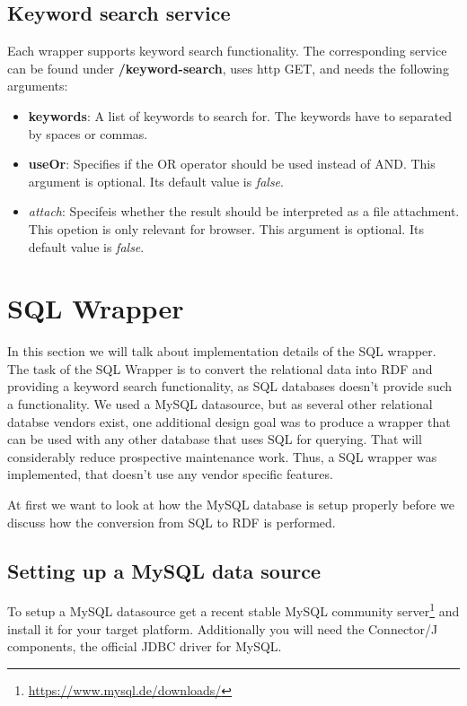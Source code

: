 \subsection{Keyword search service}

Each wrapper supports keyword search functionality. The corresponding service can be found under 
\textbf{/keyword-search}, uses http GET, and needs the following arguments:
\begin{itemize}
\item \textbf{keywords}: A list of keywords to search for. The keywords have to separated by spaces or commas.
\item \textbf{useOr}: Specifies if the OR operator should be used instead of AND. This argument is optional. Its default value is \emph{false}.
\item \emph{attach}: Specifeis whether the result should be interpreted as a file attachment. This opetion is only relevant for browser. This argument is optional. Its default value is \emph{false}.
\end{itemize}


\section{SQL Wrapper}

In this section we will talk about implementation details of the SQL wrapper. 
The task of the SQL Wrapper is to convert the relational data into RDF and providing a keyword search functionality, as SQL databases doesn't provide such a functionality.
We used a MySQL datasource, but as several other relational databse vendors exist, one additional design goal was to produce a wrapper that can be used with any other database that uses SQL for querying. That will considerably reduce prospective maintenance work.
Thus, a SQL wrapper was implemented, that doesn't use any vendor specific features.

At first we want to look at how the MySQL database is setup properly before we discuss how the conversion from SQL to RDF is performed.



\subsection{Setting up a MySQL data source}

To setup a MySQL datasource get a recent stable MySQL community server\footnote{\url{https://www.mysql.de/downloads/}} 
and install it for your target platform. Additionally you will need the Connector/J components, the official JDBC driver for MySQL. 

